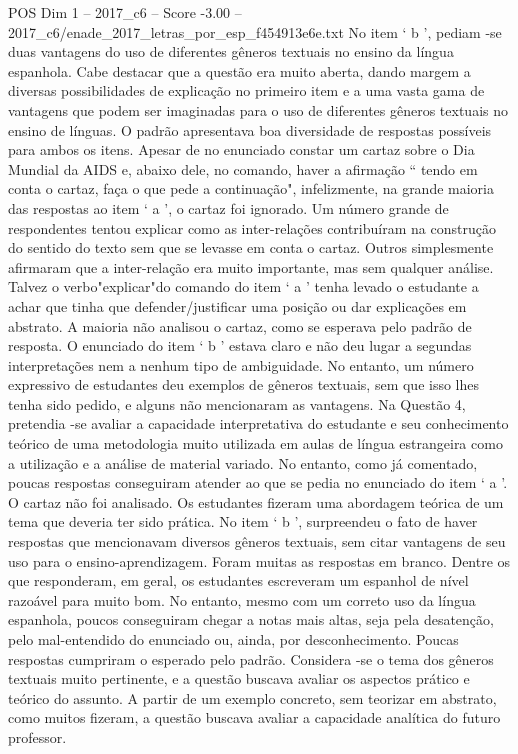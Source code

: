 \begin{textsample}{POS Dim 1 – 2017\_c6 – Score -3.00 – 2017\_c6/enade\_2017\_letras\_por\_esp\_f454913e6e.txt}
No item ‘ b ’, pediam -se duas vantagens do uso de diferentes gêneros textuais no ensino da língua espanhola.
Cabe destacar que a questão era muito aberta, dando margem a diversas possibilidades de explicação no primeiro item e a uma vasta gama de vantagens que podem ser imaginadas para o uso de diferentes gêneros textuais no ensino de línguas.
O padrão apresentava boa diversidade de respostas possíveis para ambos os itens.
Apesar de no enunciado constar um cartaz sobre o Dia Mundial da AIDS e, abaixo dele, no comando, haver a afirmação “ tendo em conta o cartaz, faça o que pede a continuação", infelizmente, na grande maioria das respostas ao item ‘ a ’, o cartaz foi ignorado.
Um número grande de respondentes tentou explicar como as inter-relações contribuíram na construção do sentido do texto sem que se levasse em conta o cartaz.
Outros simplesmente afirmaram que a inter-relação era muito importante, mas sem qualquer análise.
Talvez o verbo"explicar"do comando do item ‘ a ’ tenha levado o estudante a achar que tinha que defender/justificar uma posição ou dar explicações em abstrato.
A maioria não analisou o cartaz, como se esperava pelo padrão de resposta.
O enunciado do item ‘ b ’ estava claro e não deu lugar a segundas interpretações nem a nenhum tipo de ambiguidade.
No entanto, um número expressivo de estudantes deu exemplos de gêneros textuais, sem que isso lhes tenha sido pedido, e alguns não mencionaram as vantagens.
Na Questão 4, pretendia -se avaliar a capacidade interpretativa do estudante e seu conhecimento teórico de uma metodologia muito utilizada em aulas de língua estrangeira como a utilização e a análise de material variado.
No entanto, como já comentado, poucas respostas conseguiram atender ao que se pedia no enunciado do item ‘ a ’.
O cartaz não foi analisado.
Os estudantes fizeram uma abordagem teórica de um tema que deveria ter sido prática.
No item ‘ b ’, surpreendeu o fato de haver respostas que mencionavam diversos gêneros textuais, sem citar vantagens de seu uso para o ensino-aprendizagem.
Foram muitas as respostas em branco.
Dentre os que responderam, em geral, os estudantes escreveram um espanhol de nível razoável para muito bom.
No entanto, mesmo com um correto uso da língua espanhola, poucos conseguiram chegar a notas mais altas, seja pela desatenção, pelo mal-entendido do enunciado ou, ainda, por desconhecimento.
Poucas respostas cumpriram o esperado pelo padrão.
Considera -se o tema dos gêneros textuais muito pertinente, e a questão buscava avaliar os aspectos prático e teórico do assunto.
A partir de um exemplo concreto, sem teorizar em abstrato, como muitos fizeram, a questão buscava avaliar a capacidade analítica do futuro professor.

\end{textsample}
